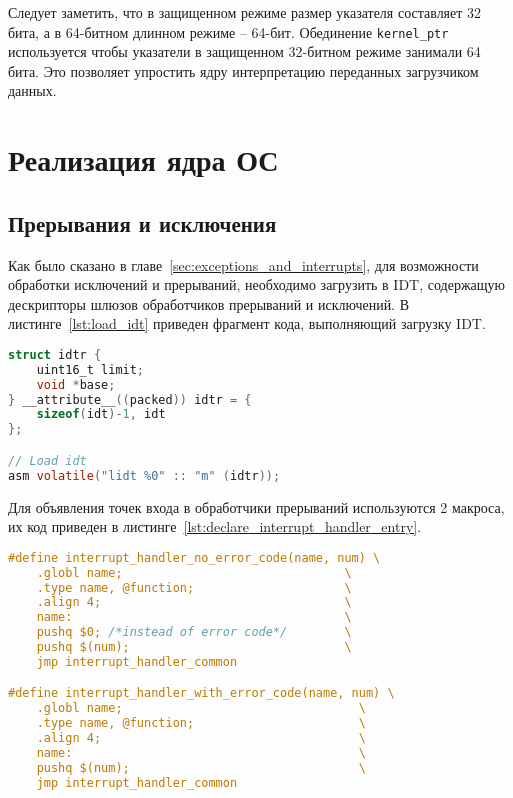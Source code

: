 Следует заметить, что в защищенном режиме размер указателя составляет 32 бита, а
в 64-битном длинном режиме -- 64-бит. Обединение \texttt{kernel\_ptr} используется
чтобы указатели в защищенном 32-битном режиме занимали 64 бита. Это позволяет
упростить ядру интерпретацию переданных загрузчиком данных.

\section{Реализация ядра ОС}
\subsection{Прерывания и исключения}
Как было сказано в главе~\ref{sec:exceptions_and_interrupts}, для возможности обработки
исключений и прерываний, необходимо загрузить в IDT, содержащую дескрипторы шлюзов
обработчиков прерываний и исключений. В листинге~\ref{lst:load_idt} приведен фрагмент кода,
выполняющий загрузку IDT.




\begin{lstlisting}[language=C,
caption={Загрузка IDT},
label={lst:load_idt}]
struct idtr {
	uint16_t limit;
	void *base;
} __attribute__((packed)) idtr = {
	sizeof(idt)-1, idt
};

// Load idt
asm volatile("lidt %0" :: "m" (idtr));
\end{lstlisting}

Для объявления точек входа в обработчики прерываний используются 2 макроса, их
код приведен в листинге~\ref{lst:declare_interrupt_handler_entry}.

\begin{lstlisting}[language=C,
caption={Макросы для объявления точек входа в обработчики прерываний},
label={lst:declare_interrupt_handler_entry}]
#define interrupt_handler_no_error_code(name, num) \
	.globl name;                               \
	.type name, @function;                     \
	.align 4;                                  \
	name:                                      \
	pushq $0; /*instead of error code*/        \
	pushq $(num);                              \
	jmp interrupt_handler_common

#define interrupt_handler_with_error_code(name, num) \
	.globl name;                                 \
	.type name, @function;                       \
	.align 4;                                    \
	name:                                        \
	pushq $(num);                                \
	jmp interrupt_handler_common
\end{lstlisting}


